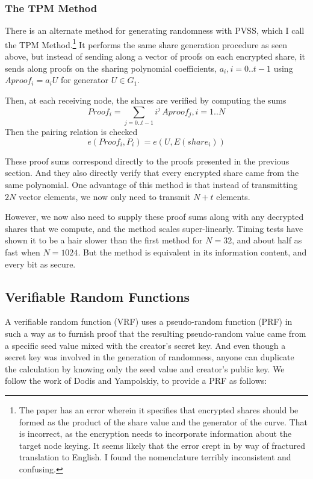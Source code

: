 \documentclass{yellowpaper}
\begin{document}

\subsubsection{The TPM Method}
There is an alternate method for generating randomness with PVSS, which I call the TPM Method.\cite{tpm}\footnote{The paper has an error wherein it specifies that encrypted shares should be formed as the product of the share value and the generator of the curve. That is incorrect, as the encryption needs to incorporate information about the target node keying. It seems likely that the error crept in by way of fractured translation to English. I found the nomenclature terribly inconsistent and confusing.} It performs the same share generation procedure as seen above, but instead of sending along a vector of proofs on each encrypted share, it sends along proofs on the sharing polynomial coefficients, $a_i, i = 0..t-1$ using $Aproof_i = a_i U$ for generator $U \in G_1$.

Then, at each receiving node, the shares are verified by computing the sums
$$ Proof_i = \sum_{j=0..t-1} i^j\, Aproof_j, i = 1..N$$
Then the pairing relation is checked
$$e(Proof_i, P_i) = e(U,E(share_i))$$

These proof sums correspond directly to the proofs presented in the previous section. And they also directly verify that every encrypted share came from the same polynomial. One advantage of this method is that instead of transmitting $2 N$ vector elements, we now only need to transmit $N+t$ elements.

However, we now also need to supply these proof sums along with any decrypted shares that we compute, and the method scales super-linearly. Timing tests have shown it to be a hair slower than the first method for $N=32$, and about half as fast when $N=1024$. But the method is equivalent in its information content, and every bit as secure.
\subsection{Verifiable Random Functions}
A verifiable random function (VRF)\cite{vrf2} uses a pseudo-random function (PRF) in such a way as to furnish proof that the resulting pseudo-random value came from a specific seed value mixed with the creator's secret key. And even though a secret key was involved in the generation of randomness, anyone can duplicate the calculation by knowing only the seed value and creator's public key. We follow the work of Dodis and Yampolskiy\cite{vrf}, to provide a PRF as follows:
\end{document}
